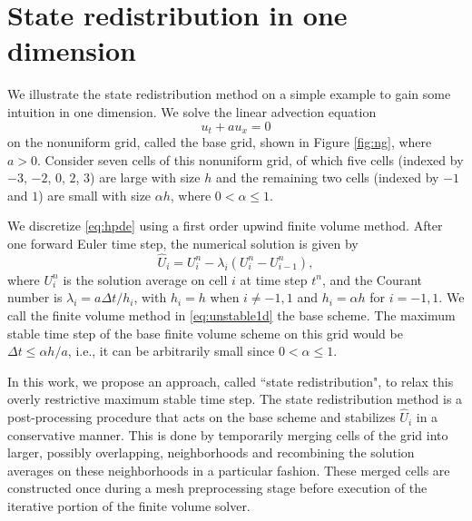 \section{State redistribution in one dimension} \label{sec:srd1d}
We illustrate the state redistribution method on a simple example to gain some intuition in one dimension.  We solve the linear advection equation
\begin{equation}\label{eq:hpde}
u_t + au_x = 0
\end{equation}
on the nonuniform grid, called the base grid, shown in Figure \ref{fig:ng}, where $a > 0$.
Consider seven cells of this nonuniform grid, of which five cells (indexed by $-3$, $-2$, $0$, $2$, $3$) are large with size $h$ and the remaining two cells (indexed by $-1$ and $1$) are small with size $\alpha h$, where $0<\alpha \leq 1$.


We discretize \eqref{eq:hpde} using a first order upwind finite volume method.  After one forward Euler time step, the numerical solution is given by
\begin{equation}\label{eq:unstable1d}
\widehat{U}_i = U^n_i - \lambda_i(U^n_i -U^n_{i-1}),
\end{equation}
where $U^n_i$ is the solution average on cell $i$ at time step $t^n$, and the Courant number is $\lambda_i = a\Delta t / h_i$, with $h_i = h$ when $i \neq -1,1$ and $h_i = \alpha h$ for $i = -1,1$.  
We call the finite volume method in \eqref{eq:unstable1d} the base scheme.  
The maximum stable time step of the base finite volume scheme on this grid would be $\Delta t \leq \alpha h/a$, i.e., it can be arbitrarily small since $0 < \alpha \leq 1$.  

In this work, we propose an approach, called ``state redistribution", to relax this overly restrictive maximum stable time step.
The state redistribution method is a post-processing procedure that acts on the base scheme and stabilizes $\widehat{U}_i$ in a conservative manner.  This is done by temporarily merging cells of the grid into larger, possibly overlapping, neighborhoods and recombining the solution averages on these neighborhoods in a particular fashion.
These merged cells are constructed once during a mesh preprocessing stage before execution of the iterative portion of the finite volume solver.

